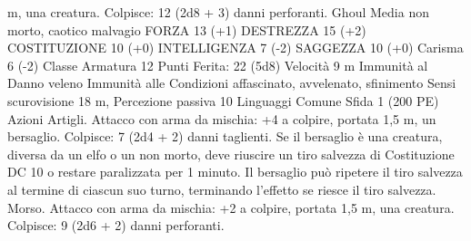 \begin{multicols}{2}
m, una creatura.
Colpisce: 12 (2d8 + 3) danni perforanti.
Ghoul
Media non morto, caotico malvagio
FORZA 13 (+1)
DESTREZZA 15 (+2)
COSTITUZIONE 10 (+0)
INTELLIGENZA 7 (-2)
SAGGEZZA 10 (+0)
Carisma 6 (-2)
Classe Armatura 12
\hspace*{0pt}\hfill{Punti Ferita}: 22 (5d8)
Velocità 9 m
Immunità al Danno veleno
Immunità alle Condizioni affascinato, avvelenato, sfinimento
Sensi scurovisione 18 m, Percezione passiva 10
Linguaggi Comune
Sfida 1 (200 PE)
Azioni
Artigli. Attacco con arma da mischia: +4 a colpire, portata 1,5
m, un bersaglio.
Colpisce: 7 (2d4 + 2) danni taglienti. Se il bersaglio è una
creatura, diversa da un elfo o un non morto, deve riuscire un tiro
salvezza di Costituzione DC 10 o restare paralizzata per 1
minuto. Il bersaglio può ripetere il tiro salvezza al termine di
ciascun suo turno, terminando l’effetto se riesce il tiro salvezza.
Morso. Attacco con arma da mischia: +2 a colpire, portata 1,5
m, una creatura.
Colpisce: 9 (2d6 + 2) danni perforanti.
 

\end{multicols}
